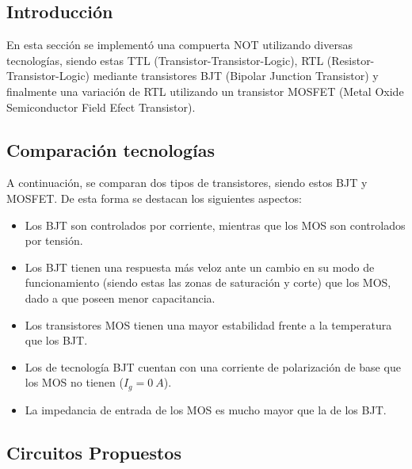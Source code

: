 \subsection{Introducción}
En esta sección se implementó una compuerta NOT utilizando diversas tecnologías, siendo estas TTL (Transistor-Transistor-Logic), RTL (Resistor-Transistor-Logic) mediante transistores BJT (Bipolar Junction Transistor) y finalmente una variación de RTL utilizando un transistor MOSFET (Metal Oxide Semiconductor Field Efect Transistor).

\subsection{Comparación tecnologías}

A continuación, se comparan dos tipos de transistores, siendo estos BJT y MOSFET. De esta forma se destacan los siguientes aspectos:
\begin{itemize}
\item Los BJT son controlados por corriente, mientras que los MOS son controlados por tensión.
\item Los BJT tienen una respuesta más veloz ante un cambio en su modo de funcionamiento (siendo estas las zonas de saturación y corte) que los MOS, dado a que poseen menor capacitancia.
\item Los transistores MOS tienen una mayor estabilidad frente a la temperatura que los BJT.	
\item Los de tecnología BJT cuentan con una corriente de polarización de base que los MOS no tienen ($I_g = 0 \ A$).
\item La impedancia de entrada de los MOS es mucho mayor que la de los BJT.
\end{itemize}

\subsection{Circuitos Propuestos}

